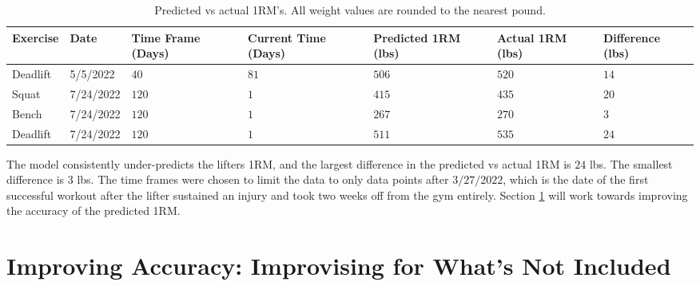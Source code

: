 \begin{table}[h]
    \centering
    \begin{tabular}{p{2cm}|p{2cm}|p{2cm}|p{2cm}|p{2cm}|p{2cm}|p{2cm}}
        Exercise & Date & Time Frame (Days) & Current Time (Days) & Predicted 1RM (lbs) & Actual 1RM (lbs) & Difference (lbs) \\
        \hline
        
        Deadlift & 5/5/2022 & $40$ & $81$ & $506$ & $520$ & $14$ \\
        Squat & 7/24/2022 & $120$ & $1$ & $415$ & $435$ & $20$ \\
        Bench & 7/24/2022 & $120$ & $1$ & $267$ & $270$ & $3$ \\
        Deadlift & 7/24/2022 & $120$ & $1$ & $511$ & $535$ & $24$ \\
    \end{tabular}
    \caption{Predicted vs actual 1RM's. All weight values are rounded to the nearest pound.}
    \label{tab:1RMPredictedVsActual}
\end{table}

The model consistently under-predicts the lifters 1RM, and the largest difference in the predicted vs actual 1RM is $24$ lbs. The smallest difference is $3$ lbs. The time frames were chosen to limit the data to only data points after $3/27/2022$, which is the date of the first successful workout after the lifter sustained an injury and took two weeks off from the gym entirely. Section \ref{sec:PotetentialSurfaceImprovingAccuracy} will work towards improving the accuracy of the predicted 1RM.

%

\section{Improving Accuracy: Improvising for What's Not Included}
\label{sec:PotetentialSurfaceImprovingAccuracy}

